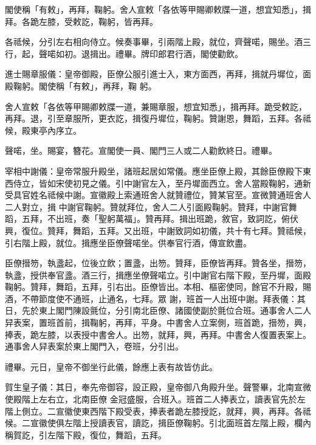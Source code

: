 \begin{pinyinscope}
 閣使稱「有敕」，再拜，鞠躬。舍人宣敕「各依等甲賜卿敕牒一道，想宜知悉」，揖拜。各跪左膝，受敕訖，鞠躬，皆再拜。



 各祗候，分引左右相向侍立。候奏事畢，引兩階上殿，就位，齊聲喏，賜坐。酒三行，起，聲喏如初。退揖出。禮畢。牌印郎君行酒，閣使勸飲。



 進士賜章服儀：皇帝御殿，臣僚公服引進士入，東方面西，再拜，揖就丹墀位，面殿鞠躬。閣使稱「有敕」，再拜，鞠
 躬。



 舍人宣敕「各依等甲賜卿敕牒一道，兼賜章服，想宜知悉」，揖再拜。跪受敕訖，再拜。退，引至章服所，更衣訖，揖復丹墀位，鞠躬。贊謝恩，舞蹈，五拜。各祗候，殿東亭內序立。



 聲喏，坐。賜宴，簪花。宣閣使一員、閣門三人或二人勸飲終日。禮畢。



 宰相中謝儀：皇帝常服升殿坐，諸班起居如常儀。應坐臣僚上殿，其餘臣僚殿下東西侍立，皆如宋使初見之儀。引中謝官左入，至丹墀面西立。舍人當殿鞠躬，通新受具官姓名祗候中謝。宣徽殿上索通班舍人就贊禮位，贊某官至。宣微贊通班舍人二人對立，揖
 中謝官鞠躬。贊就拜位，舍人二人引面殿鞠躬。贊拜，中謝官舞蹈，五拜，不出班，奏「聖躬萬福」。贊再拜。揖出班跪，敘官，致詞訖，俯伏興，復位。贊拜，舞蹈，五拜。又出班，中謝致詞如初儀，共十有七拜。贊祗候，引右階上殿，就位。揖應坐臣僚聲喏坐。供奉官行酒，傳宣飲盡。



 臣僚搢笏，執盞起，位後立飲；置盞，出笏。贊拜，臣僚皆再拜。贊各坐，搢笏，執盞，授供奉官盞。酒三行，揖應坐僚聲喏立。引中謝官右階下殿，至丹墀，面殿鞠躬。贊拜，舞蹈，五拜，引右出。臣僚皆出。本相、樞密使同，餘官不升殿，賜酒，不帶節度使不通班，止通名，七拜。眾
 謝，班首一人出班中謝。拜表儀：其日，先於東上閣門陳設氈位，分引南北臣僚、諸國使副於氈位合班。通事舍人二人舁表案，置班首前，揖鞠躬，再拜，平身。中書舍人立案側，班首跪，搢笏，興，捧表，跪左膝，以表授中書舍人。出笏，就拜，興，再拜。中書舍人復置表案上。通事舍人舁表案於東上閣門入，卷班，分引出。



 禮畢。元日，皇帝不御坐行此儀，餘應上表有故皆仿此。



 賀生皇子儀：其日，奉先帝御容，設正殿，皇帝御八角殿升坐。聲警畢，北南宣微使殿階上左右立，北南臣僚
 金冠盛服，合班入。班首二人捧表立，讀表官先於左階上側立。二宣徽使東西階下殿受表，捧表者跪左膝授訖，就拜，興，再拜。各祗候。二宣徽使俱左階上授讀表官，讀訖，揖臣僚鞠躬。引北面班首左階上殿，欄內稱賀訖，引左階下殿，復位，舞蹈，五拜。




\end{pinyinscope}
